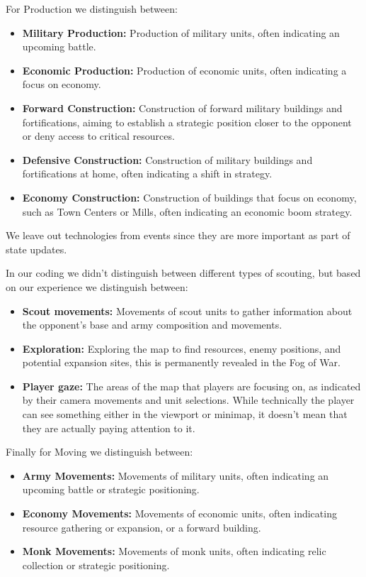 For Production we distinguish between:
\begin{itemize}
  \item \textbf{Military Production:} Production of military units, often indicating an upcoming battle.
  \item \textbf{Economic Production:} Production of economic units, often indicating a focus on economy.
  \item \textbf{Forward Construction:} Construction of forward military buildings and fortifications, aiming to establish a strategic position closer to the opponent or deny access to critical resources.
  \item \textbf{Defensive Construction:} Construction of military buildings and fortifications at home, often indicating a shift in strategy.
  \item \textbf{Economy Construction:} Construction of buildings that focus on economy, such as Town Centers or Mills, often indicating an economic boom strategy.
\end{itemize}
We leave out technologies from events since they are more important as part of state updates.

In our coding we didn't distinguish between different types of scouting, but based on our experience we distinguish between:
\begin{itemize}
  \item \textbf{Scout movements:} Movements of scout units to gather information about the opponent's base and army composition and movements.
  \item \textbf{Exploration:} Exploring the map to find resources, enemy positions, and potential expansion sites, this is permanently revealed in the Fog of War.
  \item \textbf{Player gaze:} The areas of the map that players are focusing on, as indicated by their camera movements and unit selections. While technically the player can see something either in the viewport or minimap, it doesn't mean that they are actually paying attention to it.
\end{itemize}

Finally for Moving we distinguish between:
\begin{itemize}
  \item \textbf{Army Movements:} Movements of military units, often indicating an upcoming battle or strategic positioning.
  \item \textbf{Economy Movements:} Movements of economic units, often indicating resource gathering or expansion, or a forward building.
  \item \textbf{Monk Movements:} Movements of monk units, often indicating relic collection or strategic positioning.
\end{itemize}

